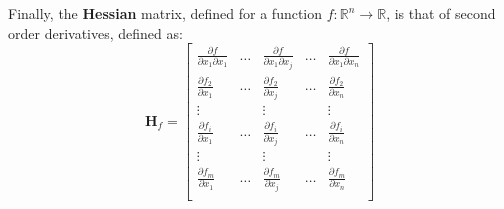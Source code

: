 Finally, the \textbf{Hessian} matrix, defined for a function $f:\mathbb{R}^n \rightarrow \mathbb{R}$, is that of second order derivatives, defined as: 
\begin{equation}
 \mathbf{H}_f = 
 \left[
\begin{array}{ccccc}
  \frac{\partial f }{\partial x_1 \partial x_1} & \dots & \frac{\partial f}{\partial x_1 \partial x_j} & \dots & \frac{\partial f }{\partial x_1 \partial x_n} \\
  \frac{\partial f_2 }{\partial x_1} & \dots & \frac{\partial f_2 }{\partial x_j} & \dots & \frac{\partial f_2 }{\partial x_n} \\
  \vdots & & \vdots & & \vdots \\
  \frac{\partial f_i }{\partial x_1} & \dots & \frac{\partial f_i }{\partial x_j} & \dots & \frac{\partial f_i }{\partial x_n} \\
  \vdots & & \vdots & & \vdots \\
  \frac{\partial f_m }{\partial x_1} & \dots & \frac{\partial f_m }{\partial x_j} & \dots & \frac{\partial f_m }{\partial x_n} \\
\end{array}
\right]
\end{equation}
